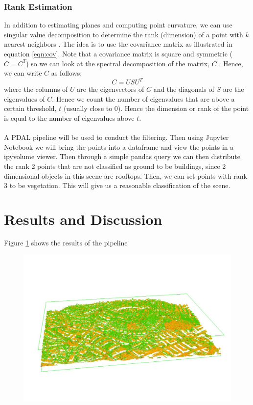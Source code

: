 \documentclass[11pt]{article}
\theoremstyle{definition}
\begin{document}
\subsubsection{Rank Estimation}\label{subsub:rank}
In addition to estimating planes and computing point curvature, we can use singular value decomposition to determine the rank (dimension) of a point with $k$ nearest neighbors \cite{pdal}.  The idea is to use the covariance matrix as illustrated in equation \ref{eqn:cov}.  Note that a covariance matrix is square and symmetric ($C = C^T$) so we can look at the spectral decomposition of the matrix, $C$ \cite{madsen2004singular}.  Hence, we can write $C$ as follows:
\begin{equation}\label{eqn:rank}
C = USU^T
\end{equation}
where the columns of $U$ are the eigenvectors of $C$ and the diagonals of $S$ are the eigenvalues of $C$.  Hence we count the number of eigenvalues that are above a certain threshold, $t$ (usually close to 0).  Hence the dimension or rank of the point is equal to the number of eigenvalues above $t$.
\\\\
A PDAL pipeline will be used to conduct the filtering.  Then using Jupyter Notebook we will bring the points into a dataframe and view the points in a ipyvolume viewer.  Then through a simple pandas query we can then distribute the rank 2 points that are not classified as ground to be buildings, since 2 dimensional objects in this scene are rooftops.  Then, we can set points with rank 3 to be vegetation.  This will give us a reasonable classification of the scene.   
\section{Results and Discussion}
Figure \ref{fig:output} shows the results of the pipeline
\begin{figure}[h]
	\centering
	\begin{minipage}{.5\textwidth}
		\centering
		\includegraphics[width=.4\linewidth]{output.png}
		\label{fig:output}
	\end{minipage}
\end{figure}
	\newpage


	
	
\end{document}
